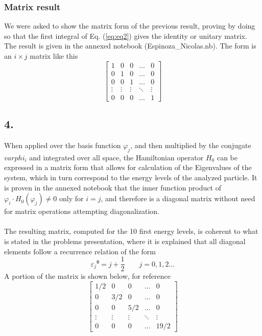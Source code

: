 \documentclass[a4paper, 12pt, notitlepage]{article}
\begin{document}
\subsubsection*{Matrix result}
We were asked to show the matrix form of the previous result, proving by doing so that the first integral of Eq. (\ref{eq:eq2}) gives the identity or unitary matrix. The result is given in the annexed notebook (Espinoza\_Nicolas.nb). The form is an $i\times j$ matrix like this
\begin{equation*}
	\begin{bmatrix}
		1 & 0 & 0 & \dots & 0 \\
		0 & 1 & 0 & \dots & 0 \\
		0 & 0 & 1 & \dots & 0 \\
		\vdots & \vdots & \vdots & \ddots & \vdots \\
		0 & 0 & 0 & \dots & 1
	\end{bmatrix}
\end{equation*}
\subsection*{4.}
When applied over the basis function $\varphi_j$, and then multiplied by the conjugate $varphi_i$ and integrated over all space, the Hamiltonian operator $H_0$ can be expressed in a matrix form that allows for calculation of the Eigenvalues of the system, which in turn correspond to the energy levels of the analyzed particle. It is proven in the annexed notebook that the inner function product of $\varphi_i\cdot H_0(\varphi_j) \neq 0$ only for $i=j$, and therefore is a diagonal matrix without need for matrix operations attempting diagonalization.\\\\
The resulting matrix, computed for the 10 first energy levels, is coherent to what is stated in the problems presentation, where it is explained that all diagonal elements follow a recurrence relation of the form
\begin{equation*}
	\varepsilon_j⁰ = j + \frac{1}{2}\qquad j =0,1,2...
\end{equation*}
A portion of the matrix is shown below, for reference
\begin{equation*}
\begin{bmatrix}
1/2 & 0 & 0 & \dots & 0 \\
0 & 3/2 & 0 & \dots & 0 \\
0 & 0 & 5/2 & \dots & 0 \\
\vdots & \vdots & \vdots & \ddots & \vdots \\
0 & 0 & 0 & \dots & 19/2
\end{bmatrix}
\end{equation*}
\end{document}
